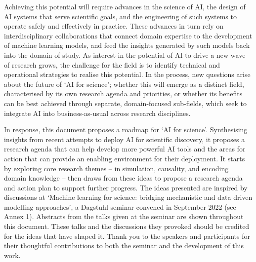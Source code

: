Achieving this potential will require advances in the science of AI, the
design of AI systems that serve scientific goals, and the engineering of
such systems to operate safely and effectively in practice. These
advances in turn rely on interdisciplinary collaborations that connect
domain expertise to the development of machine learning models, and feed
the insights generated by such models back into the domain of study. As
interest in the potential of AI to drive a new wave of research grows,
the challenge for the field is to identify technical and operational
strategies to realise this potential. In the process, new questions
arise about the future of `AI for science'; whether this will emerge as
a distinct field, characterised by its own research agenda and
priorities, or whether its benefits can be best achieved through
separate, domain-focused sub-fields, which seek to integrate AI into
business-as-usual across research disciplines.

In response, this document proposes a roadmap for `AI for science'.
Synthesising insights from recent attempts to deploy AI for scientific
discovery, it proposes a research agenda that can help develop more
powerful AI tools and the areas for action that can provide an enabling
environment for their deployment. It starts by exploring core research
themes -- in simulation, causality, and encoding domain knowledge --
then draws from these ideas to propose a research agenda and action plan
to support further progress. The ideas presented are inspired by
discussions at `Machine learning for science: bridging mechanistic and
data driven modelling approaches', a Dagstuhl seminar convened in
September 2022 (see Annex 1). Abstracts from the talks given at the
seminar are shown throughout this document. These talks and the
discussions they provoked should be credited for the ideas that have
shaped it. Thank you to the speakers and participants for their
thoughtful contributions to both the seminar and the development of this
work.
